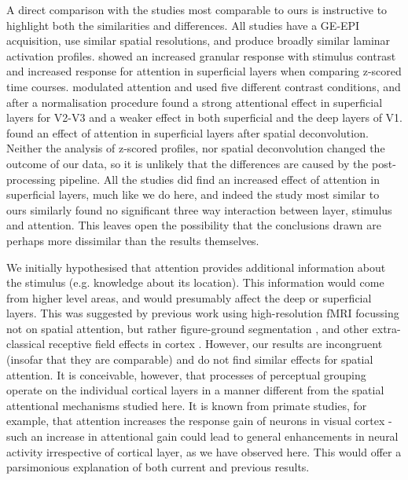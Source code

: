 \documentclass[9pt,lineno]{aperture}
\begin{document}
A direct comparison with the studies most comparable to ours \citep{Lawrence2019,Liu2020,DeHollander2020} is instructive to highlight both the similarities and differences. All studies have a GE-EPI acquisition, use similar spatial resolutions, and produce broadly similar laminar activation profiles. \citet{Lawrence2019} showed an increased granular response with stimulus contrast and increased response for attention in superficial layers when comparing z-scored time courses. \citet{Liu2020} modulated attention and used five different contrast conditions, and after a normalisation procedure found a strong attentional effect in superficial layers for V2-V3 and a weaker effect in both superficial and the deep layers of V1. \citet{DeHollander2020} found an effect of attention in superficial layers after spatial deconvolution. Neither the analysis of z-scored profiles, nor spatial deconvolution \citep{Markuerkiaga2021} changed the outcome of our data, so it is unlikely that the differences are caused by the post-processing pipeline. All the studies did find an increased effect of attention in superficial layers, much like we do here, and indeed the study most similar to ours \citep{DeHollander2020} similarly found no significant three way interaction between layer, stimulus and attention. This leaves open the possibility that the conclusions drawn are perhaps more dissimilar than the results themselves.  

We initially hypothesised that attention provides additional information about the stimulus (e.g. knowledge about its location). This information would come from higher level areas, and would presumably affect the deep or superficial layers. This was suggested by previous work using high-resolution fMRI focussing not on spatial attention, but rather figure-ground segmentation \citep{Kok2016}, and other extra-classical receptive field effects in cortex \citep{Muckli2015}. However, our results are incongruent (insofar that they are comparable) and do not find similar effects for spatial attention. It is conceivable, however, that processes of perceptual grouping operate on the individual cortical layers in a manner different from the spatial attentional mechanisms studied here. It is known from primate studies, for example, that attention increases the response gain of neurons in visual cortex \citep{Treue1999,MartinezTrujillo2004} - such an increase in attentional gain could lead to general enhancements in neural activity irrespective of cortical layer, as we have observed here. This would offer a parsimonious explanation of both current and previous results. 
\end{document}
